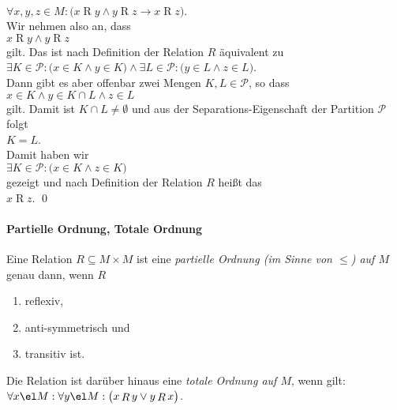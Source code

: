 \begin{enumerate}
      \\[0.2cm]
      \hspace*{1.3cm}
      $\forall x,y,z \in M:\bigl( x \mathop{R} y \wedge y \mathop{R} z \rightarrow x \mathop{R} z\bigr)$.
      \\[0.2cm]
      Wir nehmen also an, dass 
      \\[0.2cm]
      \hspace*{1.3cm}
      $x \mathop{R} y \wedge y \mathop{R} z$
      \\[0.2cm]
      gilt.  Das ist nach Definition der Relation $R$ äquivalent zu
      \\[0.2cm]
      \hspace*{1.3cm}
      $\exists K \in \mathcal{P}: \bigl(x \in K \wedge y \in K\bigr) \wedge 
       \exists L \in \mathcal{P}: \bigl(y \in L \wedge z \in L\bigr)$.
      \\[0.2cm]
      Dann gibt es aber offenbar zwei Mengen $K,L\in\mathcal{P}$, so dass
      \\[0.2cm]
      \hspace*{1.3cm}
      $x \in K \wedge y \in K \cap L \wedge z \in L$
      \\[0.2cm]
      gilt.  Damit ist $K \cap L \not= \emptyset$ und aus der 
      Separations-Eigenschaft der Partition $\mathcal{P}$ folgt 
      \\[0.2cm]
      \hspace*{1.3cm}
      $K = L$.
      \\[0.2cm]
      Damit haben wir 
      \\[0.2cm]
      \hspace*{1.3cm}
      $\exists K \in \mathcal{P}: \bigl(x \in K \wedge z \in K\bigr)$
      \\[0.2cm]
      gezeigt und nach Definition der Relation $R$ heißt das 
      \\[0.2cm]
      \hspace*{1.3cm}
      $x \mathop{R} z$. 
      \qed
\end{enumerate}

\paragraph{Partielle Ordnung, Totale Ordnung}  \hspace*{\fill} \linebreak
Eine Relation $R \subseteq M \times M$  ist eine 
\emph{partielle Ordnung (im Sinne von $\leq$) auf $M$} genau dann, wenn $R$
\begin{enumerate}
\item reflexiv,
\item anti-symmetrisch und
\item transitiv ist.
\end{enumerate}
Die Relation ist darüber hinaus eine \emph{totale Ordnung auf $M$}, wenn gilt:
\\[0.2cm]
\hspace*{1.3cm} $\forall x \el M : \forall y \el M :\bigl( x\mathop{R}y \vee y \mathop{R} x\bigr)$.

